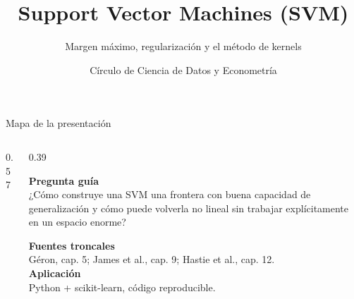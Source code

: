 \documentclass[aspectratio=169,11pt,table]{beamer}
\title{Support Vector Machines (SVM)}
\subtitle{Margen máximo, regularización y el método de kernels}
\author{Círculo de Ciencia de Datos y Econometría}
\date{}
\begin{document}


\begin{frame}{Mapa de la presentación}
\begin{columns}[T,onlytextwidth]
\begin{column}{0.57\textwidth}
\tableofcontents
\end{column}
\begin{column}{0.39\textwidth}
\begin{keybox}
\textbf{Pregunta guía}\\[0.14cm]
¿Cómo construye una SVM una frontera con buena capacidad de generalización y cómo puede volverla no lineal sin trabajar explícitamente en un espacio enorme?
\end{keybox}
\vspace{0.16cm}
\begin{ccdebox}
\small
\textbf{Fuentes troncales}\\
Géron, cap. 5; James et al., cap. 9; Hastie et al., cap. 12.\\[0.12cm]
\textbf{Aplicación}\\
Python + scikit-learn, código reproducible.
\end{ccdebox}
\end{column}
\end{columns}
\end{frame}








\end{document}

